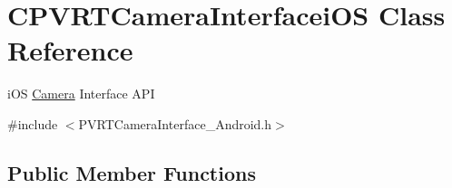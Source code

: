 \hypertarget{class_c_p_v_r_t_camera_interfacei_o_s}{\section{C\+P\+V\+R\+T\+Camera\+Interfacei\+O\+S Class Reference}
\label{class_c_p_v_r_t_camera_interfacei_o_s}
}


i\+O\+S \hyperlink{class_camera}{Camera} Interface A\+P\+I  




{\ttfamily \#include $<$P\+V\+R\+T\+Camera\+Interface\+\_\+\+Android.\+h$>$}

\subsection*{Public Member Functions}
